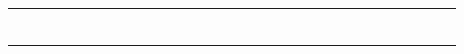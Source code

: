 \documentclass[10pt]{article}
\begin{document}
\begin{longtable}{|l|p{2.0cm}|p{2.0cm}|p{2.0cm}|l|p{0.8cm}|l|l|l|l|l|l|l|l|l|l|l|l|l|l|l|l|l|l|l|l|l|l|}
\rule{0cm}{0.75cm} & \relax & \relax & \relax & \relax & \relax & \relax & & & & & & & & & & & & & & & & & & & & & \\ \hline
\rule{0cm}{0.75cm} & \relax & \relax & \relax & \relax & \relax & \relax & & & & & & & & & & & & & & & & & & & & & \\ \hline
\rule{0cm}{0.75cm} & \relax & \relax & \relax & \relax & \relax & \relax & & & & & & & & & & & & & & & & & & & & & \\ \hline
\rule{0cm}{0.75cm} & \relax & \relax & \relax & \relax & \relax & \relax & & & & & & & & & & & & & & & & & & & & & \\ \hline
\rule{0cm}{0.75cm} & \relax & \relax & \relax & \relax & \relax & \relax & & & & & & & & & & & & & & & & & & & & & \\ \hline
\rule{0cm}{0.75cm} & \relax & \relax & \relax & \relax & \relax & \relax & & & & & & & & & & & & & & & & & & & & & \\ \hline
\rule{0cm}{0.75cm} & \relax & \relax & \relax & \relax & \relax & \relax & & & & & & & & & & & & & & & & & & & & & \\ \hline
\end{longtable}

\end{document}
